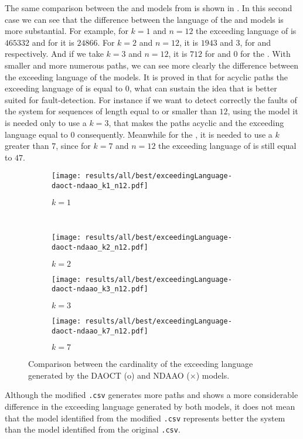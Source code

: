 The same comparison between the \DAOCT{} and \NDAAO{} models from
 is shown in .
In this second case we can see that the difference between the language of the \DAOCT{} and
\NDAAO{} models is more substantial. For example, for $k=1$ and $n=12$ the
exceeding language of \NDAAO{} is $465332$ and for \DAOCT{} it is $24866$. For
$k=2$ and $n=12$, it is $1943$ and $3$, for \NDAAO{} and \DAOCT{} respectively. And
if we take $k=3$ and $n=12$, it is $712$ for \NDAAO{} and $0$ for the \DAOCT{}. With
smaller and more numerous paths, we can see more clearly the difference between the
exceeding language of the models. It is proved in \cite{moreira2018enhanced}
that for acyclic paths the exceeding language of \DAOCT{} is equal to 0, what
can sustain the idea that \DAOCT{} is better suited for fault-detection. For instance if we want to detect correctly
the faults of the system for sequences of length equal to or smaller
than $12$, using the \DAOCT{} model it is needed only to use a $k=3$, that makes
the paths acyclic and the exceeding language equal to 0 consequently. Meanwhile for the
\NDAAO{}, it is needed to use a $k$ greater than 7, since for $k=7$ and $n=12$ the
exceeding language of \NDAAO{} is still equal to $47$. 
\begin{figure}[H]
  \begin{subfigure}[H]{0.5\textwidth}
    \centering
    \texttt{[image: results/all/best/exceedingLanguage-daoct-ndaao\_k1\_n12.pdf]}
    \caption{$k=1$}
    \label{fig:daoctNdaaoBestkone}
  \end{subfigure}
  ~
  \begin{subfigure}[h]{0.5\textwidth}
    \centering
    \texttt{[image: results/all/best/exceedingLanguage-daoct-ndaao\_k2\_n12.pdf]}
    \caption{$k=2$}
    \label{fig:daoctNdaaoBestktwo}
  \end{subfigure}
  \begin{subfigure}[h]{0.5\textwidth}
    \centering
    \texttt{[image: results/all/best/exceedingLanguage-daoct-ndaao\_k3\_n12.pdf]}
    \caption{$k=3$}
    \label{fig:daoctNdaaoBestkthree}
  \end{subfigure}
  \begin{subfigure}[h]{0.5\textwidth}
    \centering
    \texttt{[image: results/all/best/exceedingLanguage-daoct-ndaao\_k7\_n12.pdf]}
    \caption{$k=7$}
    \label{fig:daoctNdaaoBestkseven}
  \end{subfigure}
  \caption[Comparison between the cardinality of the exceeding language generated by the DAOCT and
NDAAO.]{Comparison between the cardinality of the exceeding language generated by the DAOCT (o) and
NDAAO ($\times$) models.}
\end{figure}
Although the modified \verb|.csv| generates more paths and shows a more
considerable difference in the exceeding language generated by both models, it
does not mean that the model identified from the modified \verb|.csv| represents better the
system than the model identified from the original \verb|.csv|.

